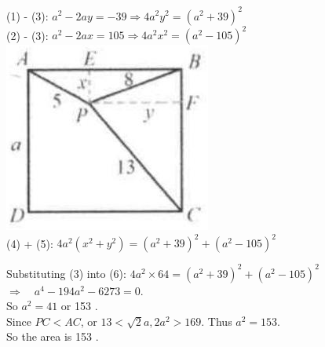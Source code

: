 \documentclass{article}
\begin{document}
(1) - (3): \(a^{2}-2 a y=-39 \Rightarrow 4 a^{2} y^{2}=\left(a^{2}+39\right)^{2}\)\\
(2) - (3): \(a^{2}-2 a x=105 \Rightarrow 4 a^{2} x^{2}=\left(a^{2}-105\right)^{2}\)\\
\centering
\includegraphics[width=\textwidth]{images/080(3).jpg}\\
(4) + (5): \(4 a^{2}\left(x^{2}+y^{2}\right)=\left(a^{2}+39\right)^{2}+\left(a^{2}-105\right)^{2}\)

Substituting (3) into (6): \(4 a^{2} \times 64=\left(a^{2}+39\right)^{2}+\left(a^{2}-105\right)^{2}\)\\
\(\Rightarrow \quad a^{4}-194 a^{2}-6273=0\).\\
So \(a^{2}=41\) or 153 .\\
Since \(P C<A C\), or \(13<\sqrt{2} a, 2 a^{2}>169\). Thus \(a^{2}=153\).\\
So the area is 153 .\\
\end{document}
